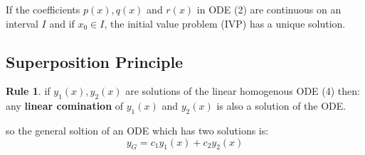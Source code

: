 \documentclass[11pt]{article}
\theoremstyle{definition}
\newtheorem{reg}{Rule}
\begin{document}
If the coefficients $p(x), q(x)$ and $r(x)$ in ODE (2) are continuous
on an interval $I$ and if $x_0\in I$, the initial value problem (IVP) has a unique solution.

\subsection{Superposition Principle}
\begin{reg}if $y_1(x), y_2(x)$ are solutions of the linear homogenous ODE (4) then: any \textbf{linear comination} of  $y_1(x)$ and $y_2(x)$ is also a solution of the ODE.
\end{reg}
so the general soltion of an ODE which has two solutions is:
\begin{equation}
    y_G = c_1 y_1(x)+c_2 y_2(x) 
\end{equation}
\end{document}
